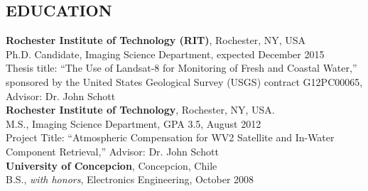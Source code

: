 \documentclass[11pt]{res} %
\begin{document}
\begin{resume}  
\vspace{-0.3in}                                         
\section{EDUCATION}
\vspace{0.1in}
{\bf Rochester Institute of Technology (RIT)}, Rochester, NY, USA\\
Ph.D. Candidate, Imaging Science Department, expected December 2015\\
Thesis title: ``The Use of Landsat-8 for Monitoring of Fresh and Coastal Water,'' sponsored by the United States Geological Survey (USGS) contract G12PC00065, Advisor: Dr. John Schott
\vspace{0.1in}\\
{\bf Rochester Institute of Technology}, Rochester, NY, USA.\\
M.S., Imaging Science Department, GPA 3.5, August 2012\\
Project Title: ``Atmospheric Compensation for WV2 Satellite and In-Water Component Retrieval,'' Advisor: Dr. John Schott
\vspace{0.1in}\\
{\bf University of Concepcion}, Concepcion, Chile \\
B.S., {\it with honors}, Electronics Engineering, October 2008\\

\vspace{-0.2in}

\end{resume}
\end{document}
